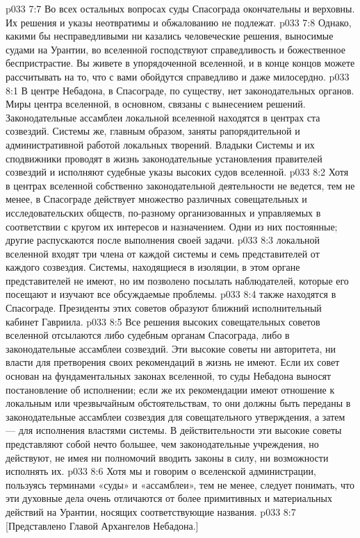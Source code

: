 \vs p033 7:7 \pc Во всех остальных вопросах суды Спасограда окончательны и верховны. Их решения и указы неотвратимы и обжалованию не подлежат.
\vs p033 7:8 Однако, какими бы несправедливыми ни казались человеческие решения, выносимые судами на Урантии, во вселенной господствуют справедливость и божественное беспристрастие. Вы живете в упорядоченной вселенной, и в конце концов можете рассчитывать на то, что с вами обойдутся справедливо и даже милосердно.
\vs p033 8:1 В центре Небадона, в Спасограде, по существу, нет законодательных органов. Миры центра вселенной, в основном, связаны с вынесением решений. Законодательные ассамблеи локальной вселенной находятся в центрах ста созвездий. Системы же, главным образом, заняты рапорядительной и административной работой локальных творений. Владыки Системы и их сподвижники проводят в жизнь законодательные установления правителей созвездий и исполняют судебные указы высоких судов вселенной.
\vs p033 8:2 Хотя в центрах вселенной собственно законодательной деятельности не ведется, тем не менее, в Спасограде действует множество различных совещательных и исследовательских обществ, по\hyp{}разному организованных и управляемых в соответствии с кругом их интересов и назначением. Одни из них постоянные; другие распускаются после выполнения своей задачи.
\vs p033 8:3 \pc {} локальной вселенной входят три члена от каждой системы и семь представителей от каждого созвездия. Системы, находящиеся в изоляции, в этом органе представителей не имеют, но им позволено посылать наблюдателей, которые его посещают и изучают все обсуждаемые проблемы.
\vs p033 8:4 \pc {} также находятся в Спасограде. Президенты этих советов образуют ближний исполнительный кабинет Гавриила.
\vs p033 8:5 \pc Все решения высоких совещательных советов вселенной отсылаются либо судебным органам Спасограда, либо в законодательные ассамблеи созвездий. Эти высокие советы ни авторитета, ни власти для претворения своих рекомендаций в жизнь не имеют. Если их совет основан на фундаментальных законах вселенной, то суды Небадона выносят постановление об исполнении; если же их рекомендации имеют отношение к локальным или чрезвычайным обстоятельствам, то они должны быть переданы в законодательные ассамблеи созвездия для совещательного утверждения, а затем --- для исполнения властями системы. В действительности эти высокие советы представляют собой нечто большее, чем законодательные учреждения, но действуют, не имея ни полномочий вводить законы в силу, ни возможности исполнять их.
\vs p033 8:6 Хотя мы и говорим о вселенской администрации, пользуясь терминами «суды» и «ассамблеи», тем не менее, следует понимать, что эти духовные дела очень отличаются от более примитивных и материальных действий на Урантии, носящих соответствующие названия.
\vsetoff
\vs p033 8:7 [Представлено Главой Архангелов Небадона.]
